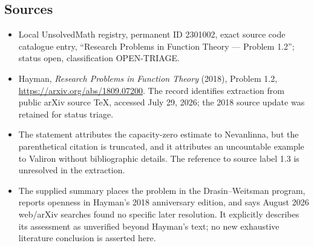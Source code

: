 \documentclass[11pt]{article}
\begin{document}
\subsection{Sources}
\begin{itemize}
\item Local UnsolvedMath registry, permanent ID 2301002, exact source code catalogue entry, ``Research Problems in Function Theory --- Problem 1.2''; status open, classification OPEN-TRIAGE.
\item Hayman, \emph{Research Problems in Function Theory} (2018), Problem 1.2, \url{https://arxiv.org/abs/1809.07200}. The record identifies extraction from public arXiv source TeX, accessed July 29, 2026; the 2018 source update was retained for status triage.
\item The statement attributes the capacity-zero estimate to Nevanlinna, but the parenthetical citation is truncated, and it attributes an uncountable example to Valiron without bibliographic details. The reference to source label 1.3 is unresolved in the extraction.
\item The supplied summary places the problem in the Drasin--Weitsman program, reports openness in Hayman's 2018 anniversary edition, and says August 2026 web/arXiv searches found no specific later resolution. It explicitly describes its assessment as unverified beyond Hayman's text; no new exhaustive literature conclusion is asserted here.
\end{itemize}
\end{document}
